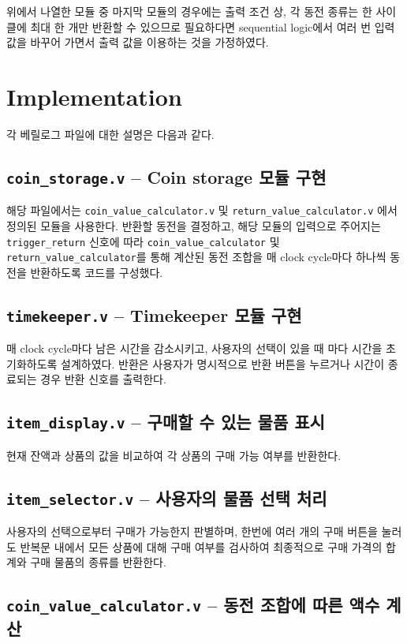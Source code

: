 \documentclass{scrartcl}
\begin{document}
위에서 나열한 모듈 중 마지막 모듈의 경우에는 출력 조건 상, 각 동전 종류는 한 사이클에 최대 한 개만 반환할 수 있으므로 필요하다면
sequential logic에서 여러 번 입력 값을 바꾸어 가면서 출력 값을 이용하는 것을 가정하였다.

\section{Implementation}
각 베릴로그 파일에 대한 설명은 다음과 같다.

\subsection{\texttt{coin\_storage.v} -- Coin storage 모듈 구현}

해당 파일에서는 \texttt{coin\_value\_calculator.v} 및 \texttt{return\_value\_calculator.v} 에서 정의된 모듈을 사용한다.
반환할 동전을 결정하고, 해당 모듈의 입력으로 주어지는 \texttt{trigger\_return} 신호에 따라 \texttt{coin\_value\_calculator} 및
\texttt{return\_value\_calculator}를 통해 계산된 동전 조합을 매 clock cycle마다 하나씩 동전을 반환하도록 코드를 구성했다.

\subsection{\texttt{timekeeper.v} -- Timekeeper 모듈 구현}

매 clock cycle마다 남은 시간을 감소시키고, 사용자의 선택이 있을 때 마다 시간을 초기화하도록 설계하였다.
반환은 사용자가 명시적으로 반환 버튼을 누르거나 시간이 종료되는 경우 반환 신호를 출력한다.

\subsection{\texttt{item\_display.v} -- 구매할 수 있는 물품 표시}

현재 잔액과 상품의 값을 비교하여 각 상품의 구매 가능 여부를 반환한다.

\subsection{\texttt{item\_selector.v} -- 사용자의 물품 선택 처리}

사용자의 선택으로부터 구매가 가능한지 판별하며, 한번에 여러 개의 구매 버튼을 눌러도 반복문 내에서
모든 상품에 대해 구매 여부를 검사하여 최종적으로 구매 가격의 합계와 구매 물품의 종류를 반환한다.

\subsection{\texttt{coin\_value\_calculator.v} -- 동전 조합에 따른 액수 계산}
\end{document}
